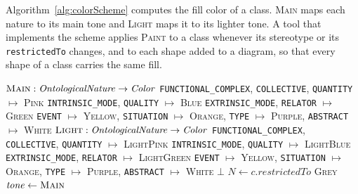 Algorithm~\ref{alg:colorScheme} computes the fill color of a class. \textsc{Main} maps each nature to its main tone and \textsc{Light} maps it to its lighter tone. A tool that implements the scheme applies \textsc{Paint} to a class whenever its stereotype or its \texttt{restrictedTo} changes, and to each shape added to a diagram, so that every shape of a class carries the same fill.

\begin{algorithm}[htbp]
  \caption{Fill color of an OntoUML class.}
  \label{alg:colorScheme}
  \begin{algorithmic}[1]
    \Statex $\textsc{Main} : \mathit{OntologicalNature} \to \mathit{Color}$
    \Statex \hspace{\algorithmicindent}\texttt{FUNCTIONAL\_COMPLEX}, \texttt{COLLECTIVE}, \texttt{QUANTITY} $\mapsto$ \textsc{Pink}
    \Statex \hspace{\algorithmicindent}\texttt{INTRINSIC\_MODE}, \texttt{QUALITY} $\mapsto$ \textsc{Blue}
    \Statex \hspace{\algorithmicindent}\texttt{EXTRINSIC\_MODE}, \texttt{RELATOR} $\mapsto$ \textsc{Green}
    \Statex \hspace{\algorithmicindent}\texttt{EVENT} $\mapsto$ \textsc{Yellow}, \texttt{SITUATION} $\mapsto$ \textsc{Orange}, \texttt{TYPE} $\mapsto$ \textsc{Purple}, \texttt{ABSTRACT} $\mapsto$ \textsc{White}
    \Statex
    \Statex $\textsc{Light} : \mathit{OntologicalNature} \to \mathit{Color}$
    \Statex \hspace{\algorithmicindent}\texttt{FUNCTIONAL\_COMPLEX}, \texttt{COLLECTIVE}, \texttt{QUANTITY} $\mapsto$ \textsc{LightPink}
    \Statex \hspace{\algorithmicindent}\texttt{INTRINSIC\_MODE}, \texttt{QUALITY} $\mapsto$ \textsc{LightBlue}
    \Statex \hspace{\algorithmicindent}\texttt{EXTRINSIC\_MODE}, \texttt{RELATOR} $\mapsto$ \textsc{LightGreen}
    \Statex \hspace{\algorithmicindent}\texttt{EVENT} $\mapsto$ \textsc{Yellow}, \texttt{SITUATION} $\mapsto$ \textsc{Orange}, \texttt{TYPE} $\mapsto$ \textsc{Purple}, \texttt{ABSTRACT} $\mapsto$ \textsc{White}
    \Statex
        \State \Return $\bot$ 
      \EndIf
      \State $N \gets c.\mathit{restrictedTo}$
        \State \Return \textsc{Grey}
      \EndIf
        \State $\mathit{tone} \gets \textsc{Main}$

\end{algorithmic}
\end{algorithm}
